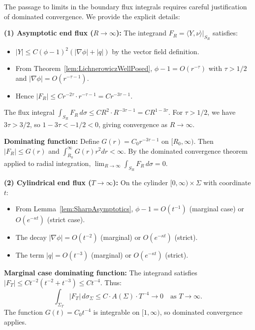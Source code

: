 \begin{remark}\label{rem:DominatedConvergenceJustification}
The passage to limits in the boundary flux integrals requires careful justification of dominated convergence. We provide the explicit details:

\textbf{(1) Asymptotic end flux ($R \to \infty$):}
The integrand $F_R = \langle Y, \nu \rangle|_{S_R}$ satisfies:
\begin{itemize}
    \item $|Y| \le C(\phi-1)^2 (|\nabla\phi| + |q|)$ by the vector field definition.
    \item From Theorem~\ref{lem:LichnerowiczWellPosed}, $\phi - 1 = O(r^{-\tau})$ with $\tau > 1/2$ and $|\nabla\phi| = O(r^{-\tau-1})$.
    \item Hence $|F_R| \le C r^{-2\tau} \cdot r^{-\tau-1} = C r^{-3\tau-1}$.
\end{itemize}
The flux integral $\int_{S_R} F_R \, d\sigma \le C R^{2} \cdot R^{-3\tau-1} = C R^{1-3\tau}$. For $\tau > 1/2$, we have $3\tau > 3/2$, so $1 - 3\tau < -1/2 < 0$, giving convergence as $R \to \infty$.

\textbf{Dominating function:} Define $G(r) = C_0 r^{-3\tau-1}$ on $[R_0, \infty)$. Then $|F_R| \le G(r)$ and $\int_{R_0}^\infty G(r) r^2 dr < \infty$. By the dominated convergence theorem applied to radial integration, $\lim_{R\to\infty} \int_{S_R} F_R \, d\sigma = 0$.

\textbf{(2) Cylindrical end flux ($T \to \infty$):}
On the cylinder $[0,\infty) \times \Sigma$ with coordinate $t$:
\begin{itemize}
    \item From Lemma~\ref{lem:SharpAsymptotics}, $\phi - 1 = O(t^{-1})$ (marginal case) or $O(e^{-\kappa t})$ (strict case).
    \item The decay $|\nabla\phi| = O(t^{-2})$ (marginal) or $O(e^{-\kappa t})$ (strict).
    \item The term $|q| = O(t^{-3})$ (marginal) or $O(e^{-\kappa t})$ (strict).
\end{itemize}

\textbf{Marginal case dominating function:} The integrand satisfies $|F_T| \le C t^{-2} (t^{-2} + t^{-3}) \le C t^{-4}$. Thus:
\[
    \int_{\Sigma_T} |F_T| \, d\sigma_\Sigma \le C \cdot A(\Sigma) \cdot T^{-4} \to 0 \quad \text{as } T \to \infty.
\]
The function $G(t) = C_0 t^{-4}$ is integrable on $[1, \infty)$, so dominated convergence applies.


\end{remark}

